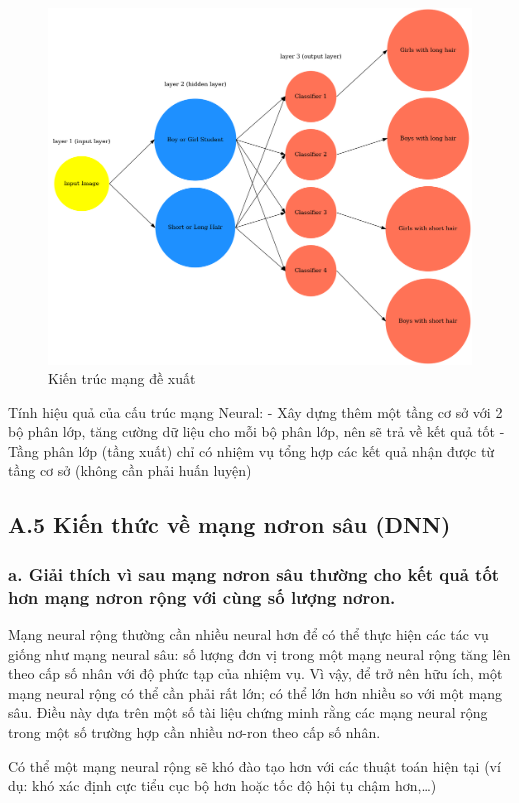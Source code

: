 \documentclass{article}
\begin{document}
	\begin{figure}[H]
		\centering
		\includegraphics[width=0.75\linewidth]{images/nets.png}
		\caption{Kiến trúc mạng đề xuất}
		\label{fig:writing-thesis}
	\end{figure}
	
	Tính hiệu quả của cấu trúc mạng Neural:
	- Xây dựng thêm một tầng cơ sở với 2 bộ phân lớp, tăng cường dữ liệu cho mỗi bộ phân lớp, nên sẽ trả về kết quả tốt
	- Tầng phân lớp (tầng xuất) chỉ có nhiệm vụ tổng hợp các kết quả nhận được từ tầng cơ sở (không cần phải huấn luyện)
	
	
	\subsection{A.5 Kiến thức về mạng nơron sâu (DNN)}
	
	\subsubsection{a. Giải thích vì sau mạng nơron sâu thường cho kết quả tốt hơn mạng nơron rộng với cùng số
		lượng nơron.}
	
	\qquad Mạng neural rộng thường cần nhiều neural hơn để có thể thực hiện các tác vụ giống như mạng neural sâu: số lượng đơn vị trong một mạng neural rộng tăng lên theo cấp số nhân với độ phức tạp của nhiệm vụ. Vì vậy, để trở nên hữu ích, một mạng neural rộng có thể cần phải rất lớn; có thể lớn hơn nhiều so với một mạng sâu. Điều này dựa trên một số tài liệu chứng minh rằng các mạng neural rộng trong một số trường hợp cần nhiều nơ-ron theo cấp số nhân.
	
	Có thể một mạng neural rộng sẽ khó đào tạo hơn với các thuật toán hiện tại (ví dụ: khó xác định cực tiểu cục bộ hơn hoặc tốc độ hội tụ chậm hơn,…)
	
\end{document}
